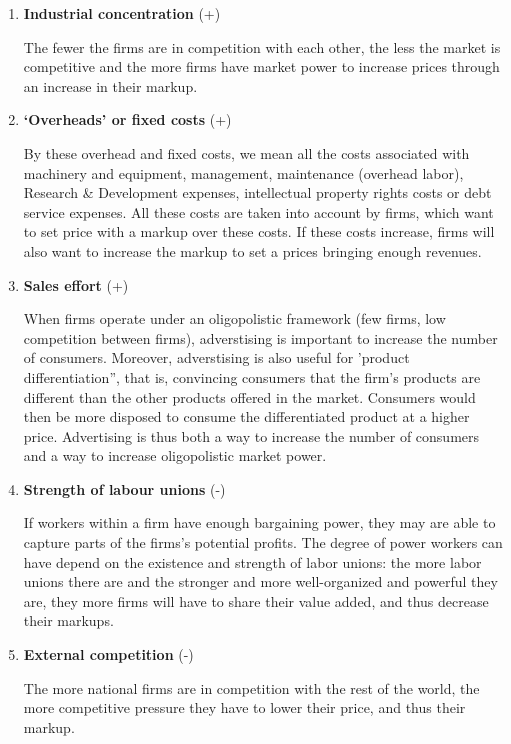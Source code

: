 \documentclass[
  letterpaper,
  DIV=11,
  numbers=noendperiod]{scrreprt}
\begin{document}
\begin{enumerate}
\def\labelenumi{\arabic{enumi}.}
\item
  \textbf{Industrial concentration} (+)

  The fewer the firms are in competition with each other, the less the
  market is competitive and the more firms have market power to increase
  prices through an increase in their markup.
\item
  \textbf{`Overheads' or fixed costs} (+)

  By these overhead and fixed costs, we mean all the costs associated
  with machinery and equipment, management, maintenance (overhead
  labor), Research \& Development expenses, intellectual property rights
  costs or debt service expenses. All these costs are taken into account
  by firms, which want to set price with a markup over these costs. If
  these costs increase, firms will also want to increase the markup to
  set a prices bringing enough revenues.
\item
  \textbf{Sales effort} (+)

  When firms operate under an oligopolistic framework (few firms, low
  competition between firms), adverstising is important to increase the
  number of consumers. Moreover, adverstising is also useful for
  'product differentiation'', that is, convincing consumers that the
  firm's products are different than the other products offered in the
  market. Consumers would then be more disposed to consume the
  differentiated product at a higher price. Advertising is thus both a
  way to increase the number of consumers and a way to increase
  oligopolistic market power.
\item
  \textbf{Strength of labour unions} (-)

  If workers within a firm have enough bargaining power, they may are
  able to capture parts of the firms's potential profits. The degree of
  power workers can have depend on the existence and strength of labor
  unions: the more labor unions there are and the stronger and more
  well-organized and powerful they are, they more firms will have to
  share their value added, and thus decrease their markups.
\item
  \textbf{External competition} (-)

  The more national firms are in competition with the rest of the world,
  the more competitive pressure they have to lower their price, and thus
  their markup.
\end{enumerate}
\end{document}
